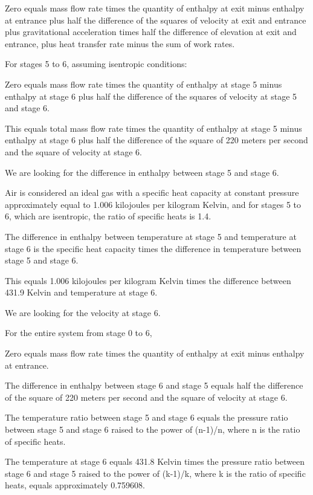 Zero equals mass flow rate times the quantity of enthalpy at exit minus enthalpy at entrance plus half the difference of the squares of velocity at exit and entrance plus gravitational acceleration times half the difference of elevation at exit and entrance, plus heat transfer rate minus the sum of work rates.

For stages 5 to 6, assuming isentropic conditions:

Zero equals mass flow rate times the quantity of enthalpy at stage 5 minus enthalpy at stage 6 plus half the difference of the squares of velocity at stage 5 and stage 6.

This equals total mass flow rate times the quantity of enthalpy at stage 5 minus enthalpy at stage 6 plus half the difference of the square of 220 meters per second and the square of velocity at stage 6.

We are looking for the difference in enthalpy between stage 5 and stage 6.

Air is considered an ideal gas with a specific heat capacity at constant pressure approximately equal to 1.006 kilojoules per kilogram Kelvin, and for stages 5 to 6, which are isentropic, the ratio of specific heats is 1.4.

The difference in enthalpy between temperature at stage 5 and temperature at stage 6 is the specific heat capacity times the difference in temperature between stage 5 and stage 6.

This equals 1.006 kilojoules per kilogram Kelvin times the difference between 431.9 Kelvin and temperature at stage 6.

We are looking for the velocity at stage 6.

For the entire system from stage 0 to 6,

Zero equals mass flow rate times the quantity of enthalpy at exit minus enthalpy at entrance.

The difference in enthalpy between stage 6 and stage 5 equals half the difference of the square of 220 meters per second and the square of velocity at stage 6.

The temperature ratio between stage 5 and stage 6 equals the pressure ratio between stage 5 and stage 6 raised to the power of (n-1)/n, where n is the ratio of specific heats.

The temperature at stage 6 equals 431.8 Kelvin times the pressure ratio between stage 6 and stage 5 raised to the power of (k-1)/k, where k is the ratio of specific heats, equals approximately 0.759608.

